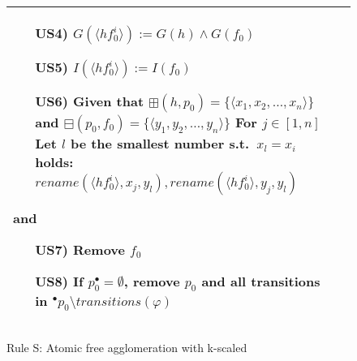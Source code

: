 \begin{figure}
\begin{adjustbox}{center}
\begin{tabular}{|p{70mm}|p{70mm}|}
\begin{itemize}[leftmargin=10mm]
            \item[US4)] $G(\langle hf_0^i\rangle):= G(h) \land G(f_0)$
            \item[US5)] $I(\langle hf_0^i\rangle):= I(f_0)$
            \item[US6)] Given that $\boxplus(h,p_0) = \{\langle x_1, x_2, \dots, x_n \rangle\}$ and $\boxminus(p_0, f_0) = \{\langle y_1, y_2, \dots, y_n \rangle\}$\newline
            For $j\in[1,n]$\newline
            Let $l$ be the smallest number s.t.\ $x_l = x_i$ holds:\newline
            $rename(\langle hf_0^i \rangle, x_j, y_l), rename(\langle hf_0^i \rangle, y_j, y_l)$
        \end{itemize}
        and
        \begin{itemize}[leftmargin=10mm]
            \item[US7)] Remove $f_0$
            \item[US8)] If $p_0^\bullet = \emptyset$, remove $p_0$ and all transitions in ${}^\bullet p_0\setminus transitions(\varphi)$
        \end{itemize} \\ \hline
        \end{tabular}
    \end{adjustbox}
    \caption{Rule S: Atomic free agglomeration with k-scaled}
    \label{fig:rule_s_cpn}
\end{figure}
